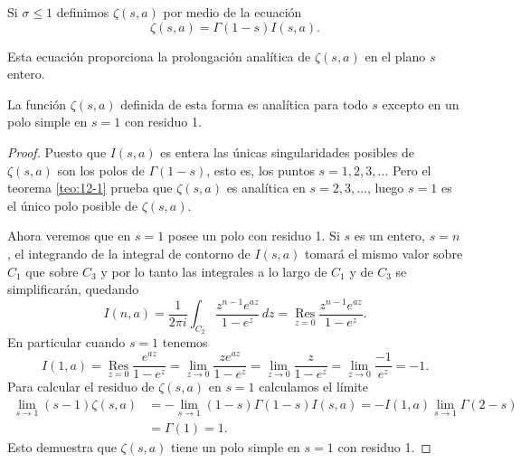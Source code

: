 \documentclass[12pt,a4paper]{book}
\begin{document}
    \begin{definicion}
        Si $\sigma\leq1$ definimos $\zeta(s,a)$ por medio de la ecuación
        \begin{equation}\label{eq:12-7}
            \zeta(s,a)=\Gamma(1-s)I(s,a).
        \end{equation}
    \end{definicion}

    Esta ecuación proporciona la prolongación analítica de $\zeta(s,a)$ en el plano $s$
    entero.

    \begin{teorema}\label{teo:12-4}
        La función $\zeta(s,a)$ definida de esta forma es analítica para todo $s$ excepto en un
        polo simple en $s=1$ con residuo 1.
    \end{teorema}

    \begin{proof}
        Puesto que $I(s,a)$ es entera las únicas singularidades posibles de $\zeta(s,a)$ son
        los polos de $\Gamma(1-s)$, esto es, los puntos $s=1,2,3,\dots$ Pero el teorema
        \ref{teo:12-1} prueba que $\zeta(s,a)$ es analítica en $s=2,3,\dots$, luego $s=1$ es
        el único polo posible de $\zeta(s,a)$.

        Ahora veremos que en $s=1$ posee un polo con residuo 1. Si $s$ es un entero, $s=n$, el
        integrando de la integral de contorno de $I(s,a)$ tomará el mismo valor sobre $C_{1}$
        que sobre $C_{3}$ y por lo tanto las integrales a lo largo de $C_{1}$ y de $C_{3}$ se
        simplificarán, quedando
        \begin{equation*}
            I(n,a)=\frac{1}{2\pi i}\int_{C_{2}}\frac{z^{n-1}e^{az}}{1-e^{z}}\,dz=\operatorname*{Res}_{z=0}\frac{z^{n-1}e^{az}}{1-e^{z}}.
        \end{equation*}
        En particular cuando $s=1$ tenemos
        \begin{equation*}
            I(1,a)=\operatorname*{Res}_{z=0}\frac{e^{az}}{1-e^{z}}=\lim_{z\to0}\frac{ze^{az}}{1-e^{z}}=\lim_{z\to0}\frac{z}{1-e^{z}}=\lim_{z\to0}\frac{-1}{e^{z}}=-1.
        \end{equation*}
        Para calcular el residuo de $\zeta(s,a)$ en $s=1$ calculamos el límite
        \begin{align*}
            \lim_{s\to1}(s-1)\zeta(s,a)&=-\lim_{s\to1}(1-s)\Gamma(1-s)I(s,a)=-I(1,a)\lim_{s\to1}\Gamma(2-s)\\
            &=\Gamma(1)=1.
        \end{align*}
        Esto demuestra que $\zeta(s,a)$ tiene un polo simple en $s=1$ con residuo 1.
    \end{proof}
\end{document}
